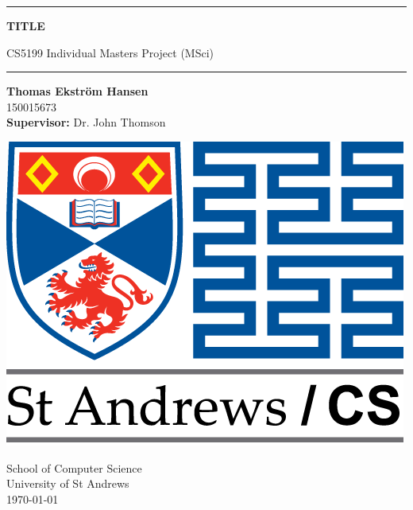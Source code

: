 \begin{titlepage}
    \begin{center}
        \vspace*{1cm}
        
        {\rule{0.9\textwidth}{0.5mm}}
        
        \Huge
        \textbf{TITLE}
        
        \LARGE
        CS5199 Individual Masters Project (MSci)
        
        {\noindent \hspace*{-0.65cm} \rule[0.3cm]{1.08\textwidth}{0.5mm}}
        
        \vspace{1.5cm}
        
        \sffamily
        \Large
        \textbf{Thomas Ekstr{\" o}m Hansen}\\150015673
        \\
        \textbf{Supervisor:} Dr. John Thomson
        \Large
        \rmfamily
        
        \vfill
        
        \includegraphics[width=0.4\linewidth]{logo-uni-cs-mintext-long.png}
        
        \vspace{1.5cm}
        
        School of Computer Science
        \\
        University of St Andrews
        \\
        \vspace{3mm}
        \today
    \end{center}
\end{titlepage}